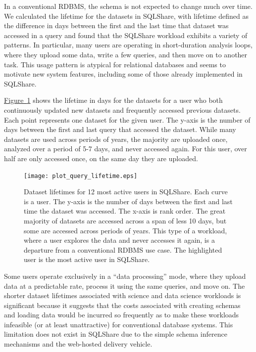 \documentclass{sig-alternate}
\newcommand{\figref}[1]{\hyperref[#1]{Figure~\ref*{#1}}}
\newcommand{\sqlshare}{SQLShare}
\begin{document}
In a conventional RDBMS, the schema is not expected to change much over time.
We calculated the lifetime for the datasets in \sqlshare{}, with lifetime defined as the difference in days between the first and the last time that dataset was accessed in a query and found that the \sqlshare{} workload exhibits a variety of patterns.  In particular, many users are operating in short-duration analysis loops, where they upload some data, write a few queries, and then move on to another task.  
This usage pattern is atypical for relational databases and seems to motivate new system features, including some of those already implemented in \sqlshare{}.

\figref{fig:shortlifetime} shows the lifetime in days for the datasets for a user who both continuously updated new datasets and frequently accessed previous datasets.  Each point represents one dataset for the given user.  The y-axis is the number of days between the first and last query that accessed the dataset. While many datasets are used across periods of years, the majority are uploaded once, analyzed over a period of 5-7 days, and never accessed again.  For this user, over half are only accessed once, on the same day they are uploaded. 
\begin{figure}[h]
\centering
\texttt{[image: plot\_query\_lifetime.eps]}
\vspace{-10pt}
\caption{Dataset lifetimes for 12 most active users in \sqlshare{}. Each curve is a user. The y-axis is the number of days between the first and last time the dataset was accessed. The x-axis is rank order. The great majority of datasets are accessed across a span of less 10 days, but some are accessed across periods of years. This type of a workload, where a user explores the data and never accesses it again, is a departure from a conventional RDBMS use case. The highlighted user is the most active user in \sqlshare{}.}
\label{fig:shortlifetime}
\vspace{-10pt}
\end{figure}
Some users operate exclusively in a ``data processing'' mode, where they upload data at a predictable rate, process it using the same queries, and move on.
The shorter dataset lifetimes associated with science and data science workloads is significant because it suggests that the costs associated with creating schemas and loading data would be incurred so frequently as to make these workloads infeasible (or at least unattractive) for conventional database systems.  
This limitation does not exist in \sqlshare{} due to the simple schema inference mechanisms and the web-hosted delivery vehicle.
\end{document}
